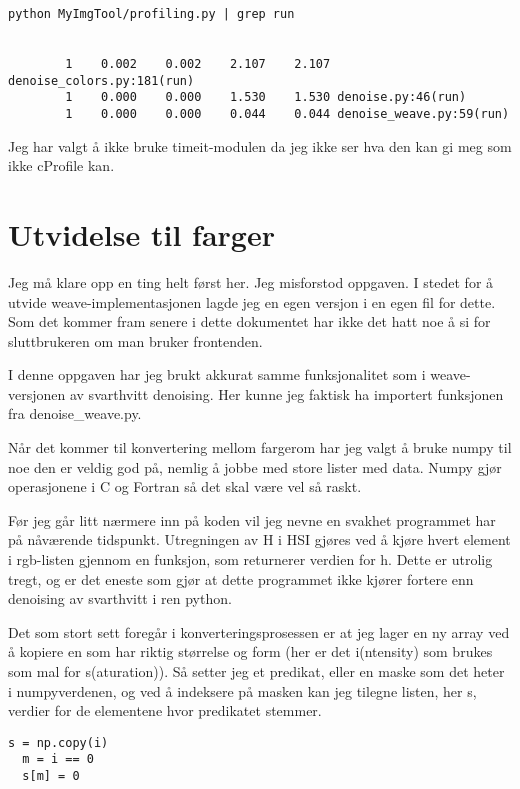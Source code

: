\documentclass{article}
\renewenvironment{shadedwbar}{
\def\FrameCommand{\color[rgb]{0.7,     0.95686, 1}\vrule width 1mm\normalcolor\colorbox{shadecolor}}\FrameRule0.6pt
\MakeFramed {\advance\hsize-2mm\FrameRestore}\vskip3mm}{\vskip0mm\endMakeFramed}
\renewenvironment{shadedquoteBlueBar}[1][]{
\bgroup\rmfamily
\fboxsep=0mm\relax
\begin{shadedwbar}
\list{}{\parsep=-2mm\parskip=0mm\topsep=0pt\leftmargin=2mm
\rightmargin=2\leftmargin\leftmargin=4pt\relax}
\item\relax}
{\endlist\end{shadedwbar}\egroup}
\begin{document}
\begin{Verbatim}[numbers=none,frame=lines,label=\fbox{{\tiny Terminal}},fontsize=\fontsize{9pt}{9pt},
labelposition=topline,framesep=2.5mm,framerule=0.7pt]
python MyImgTool/profiling.py | grep run


        1    0.002    0.002    2.107    2.107 denoise_colors.py:181(run)
        1    0.000    0.000    1.530    1.530 denoise.py:46(run)
        1    0.000    0.000    0.044    0.044 denoise_weave.py:59(run)
\end{Verbatim}
\noindent

Jeg har valgt å ikke bruke timeit-modulen da jeg ikke ser hva den
kan gi meg som ikke cProfile kan.

\section{Utvidelse til farger}
Jeg må klare opp en ting helt først her. Jeg misforstod oppgaven.
I stedet for å utvide weave-implementasjonen lagde jeg en egen
versjon i en egen fil for dette.
Som det kommer fram senere i dette dokumentet har ikke det hatt
noe å si for sluttbrukeren om man bruker frontenden.

I denne oppgaven har jeg brukt akkurat samme funksjonalitet som i
weave-versjonen av svarthvitt denoising. Her kunne jeg faktisk
ha importert funksjonen fra denoise\_weave.py.

Når det kommer til konvertering mellom fargerom har jeg valgt å
bruke numpy til noe den er veldig god på, nemlig å jobbe med
store lister med data. Numpy gjør operasjonene i C og Fortran
så det skal være vel så raskt.

Før jeg går litt nærmere inn på koden vil jeg nevne en svakhet
programmet har på nåværende tidspunkt.
Utregningen av H i HSI gjøres ved å kjøre hvert element i rgb-listen
gjennom en funksjon, som returnerer verdien for h.
Dette er utrolig tregt, og er det eneste som gjør at dette programmet
ikke kjører fortere enn denoising av svarthvitt i ren python.

Det som stort sett foregår i konverteringsprosessen er at jeg lager
en ny array ved å kopiere en som har riktig størrelse og form (her
er det i(ntensity) som brukes som mal for s(aturation)).
Så setter jeg et predikat, eller en maske som det heter i numpyverdenen,
og ved å indeksere på masken kan jeg tilegne listen, her s, verdier
for de elementene hvor predikatet stemmer.
\begin{shadedquoteBlueBar}
\fontsize{9pt}{9pt}
\begin{Verbatim}
s = np.copy(i)
  m = i == 0
  s[m] = 0
\end{Verbatim}
\end{shadedquoteBlueBar}
\noindent
\end{document}
